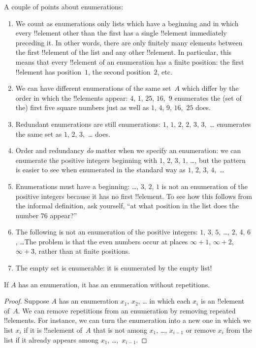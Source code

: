 \documentclass[../../../include/open-logic-section]{subfiles}
\begin{document}
\begin{explain}
A couple of points about enumerations:
\begin{enumerate}
\item We count as enumerations only lists which have a beginning and
  in which every !!{element} other than the first has a single
  !!{element} immediately preceding it.  In other words, there are
  only finitely many elements between the first !!{element} of the
  list and any other !!{element}. In particular, this means that every
  !!{element} of an enumeration has a finite position: the first
  !!{element} has position~$1$, the second position~$2$, etc.
\item We can have different enumerations of the same set~$A$ which
  differ by the order in which the !!{element}s appear: $4$, $1$,
  $25$, $16$,~$9$ enumerates the (set of the) first five square
  numbers just as well as $1$, $4$, $9$, $16$,~$25$ does.
\item Redundant enumerations are still enumerations: $1$, $1$, $2$,
  $2$, $3$, $3$,~\dots{} enumerates the same set as $1$, $2$,
  $3$,~\dots{} does.
\item Order and redundancy \emph{do} matter when we specify an
  enumeration: we can enumerate the positive integers beginning with
  $1$, $2$, $3$, $1$, \dots{}, but the pattern is easier to see when
  enumerated in the standard way as $1$, $2$, $3$, $4$,~\dots
\item Enumerations must have a beginning: \dots, $3$, $2$, $1$ is not
  an enumeration of the positive integers because it has no first
  !!{element}. To see how this follows from the informal definition,
  ask yourself, ``at what position in the list does the number 76
  appear?''
\item The following is not an enumeration of the positive integers:
  $1$, $3$, $5$, \dots, $2$, $4$, $6$, \dots\@ The problem is that the
  even numbers occur at places $\infty + 1$, $\infty + 2$, $\infty +
  3$, rather than at finite positions.
\item The empty set is enumerable: it is enumerated by the empty list!{}
\end{enumerate}
\end{explain}

\begin{prop}
  If $A$ has an enumeration, it has an enumeration without
  repetitions.
\end{prop}

\begin{proof}
  Suppose $A$ has an enumeration $x_1$, $x_2$, \dots{} in which each
  $x_i$ is an !!{element} of~$A$.  We can remove repetitions from an
  enumeration by removing repeated !!{element}s. For instance, we can
  turn the enumeration into a new one in which we list $x_i$ if
  it is !!a{element} of~$A$ that is not among $x_1$, \dots,
  $x_{i-1}$ or remove $x_i$ from the list if it already appears among
  $x_1$, \dots,~$x_{i-1}$.
\end{proof}
\end{document}
